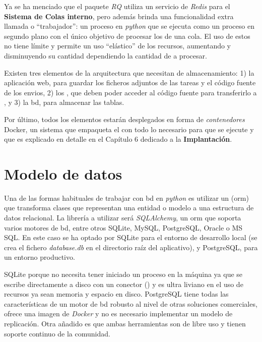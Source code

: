 \documentclass[11pt,spanish,listoffigures,listoftables]{tfgetsinf}
\begin{document}
Ya se ha menciado que el \gls{paquete} \textit{RQ} utiliza un servicio de \textit{Redis} para el \textbf{Sistema de Colas interno}, pero además brinda una funcionalidad extra llamada  o ``trabajador'': un proceso en \textit{python} que se ejecuta como un proceso en segundo plano con el único objetivo de procesar los  de una \gls{cola}. El uso de estos  no tiene límite y permite un uso ``elástico'' de los recursos, aumentando y disminuyendo su cantidad dependiendo la cantidad de  a procesar.

Existen tres elementos de la arquitectura que necesitan de almacenamiento: 1) la aplicación web, para guardar los ficheros adjuntos de las \gls{tarea}s y el código fuente de los \gls{envio}s, 2) los , que deben poder acceder al código fuente para transferirlo a \kahan, y 3) la \acrlong{bd}, para almacenar las tablas.

Por último, todos los elementos estarán desplegados en forma de \textit{contenedores} Docker, un sistema que empaqueta el  con todo lo necesario para que se ejecute y que es explicado en detalle en el Capítulo 6 dedicado a la \textbf{Implantación}.

\section {Modelo de datos}

Una de las formas habituales de trabajar con \acrshort{bd} en \textit{python} es utilizar un  (\acrshort{orm})  que transforma clases que representan una entidad o modelo a una estructura de datos relacional. La librería a utilizar será \textit{SQLAlchemy}, un \acrshort{orm} que soporta varios motores de \acrshort{bd}, entre otros SQLite, MySQL, PostgreSQL, Oracle o MS SQL. En este caso se ha optado por SQLite para el entorno de desarrollo local (se crea el fichero \textit{database.db} en el directorio raíz del aplicativo), y PostgreSQL, para un entorno productivo.

SQLite porque no necesita tener iniciado un proceso en la máquina ya que se escribe directamente a disco con un conector () y es ultra liviano en el uso de recursos ya sean memoria y espacio en disco. PostgreSQL tiene todas las características de un motor de \acrshort{bd} robusto al nivel de otras soluciones comerciales, ofrece una imagen de \textit{Docker} y no es necesario implementar un modelo de replicación. Otra añadido es que ambas herramientas son de libre uso y tienen soporte continuo de la comunidad.
\end{document}
